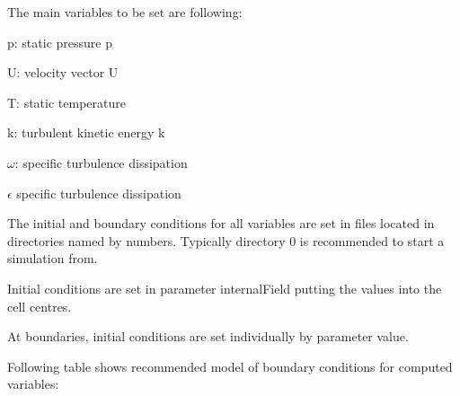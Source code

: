 \documentclass{article}
\begin{document}
The main variables to be set are following:

p: static pressure p

U: velocity vector U

T: static temperature

k: turbulent kinetic energy k

$\omega$: specific turbulence dissipation 

$\epsilon$ specific turbulence dissipation

The initial and boundary conditions for all variables are set in files located in directories named by numbers. Typically directory 0 is recommended to start a simulation from. 

Initial conditions are set in parameter internalField putting the values into the cell centres. 

At boundaries, initial conditions are set individually by parameter value.

Following table shows recommended model of boundary conditions for computed variables:
\end{document}
